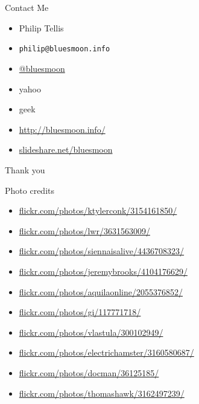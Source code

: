 \documentclass{beamer}
\begin{document}
\section{}

\begin{frame}{Contact Me}
  \begin{itemize}
  \item Philip Tellis
  \item \small{\texttt{philip@bluesmoon.info}}
  \item \href{http://twitter.com/bluesmoon}{@bluesmoon}
  \item yahoo
  \item geek
  \item \href{http://bluesmoon.info/}{http://bluesmoon.info/}
  \item \href{http://www.slideshare.net/bluesmoon}{slideshare.net/bluesmoon}
  \end{itemize}
\end{frame}

\begin{frame}{}
  \begin{center}
  \Large{Thank you}
  \end{center}
\end{frame}

\begin{frame}{Photo credits}
  \begin{itemize}
  \item \href{http://www.flickr.com/photos/ktylerconk/3154161850/}{flickr.com/photos/ktylerconk/3154161850/}
  \item \href{http://www.flickr.com/photos/lwr/3631563009/}{flickr.com/photos/lwr/3631563009/}
  \item \href{http://www.flickr.com/photos/siennaisalive/4436708323/}{flickr.com/photos/siennaisalive/4436708323/}
  \item \href{http://www.flickr.com/photos/jeremybrooks/4104176629/}{flickr.com/photos/jeremybrooks/4104176629/}
  \item \href{http://www.flickr.com/photos/aquilaonline/2055376852/}{flickr.com/photos/aquilaonline/2055376852/}
  \item \href{http://www.flickr.com/photos/gi/117771718/}{flickr.com/photos/gi/117771718/}
  \item \href{http://www.flickr.com/photos/vlastula/300102949/}{flickr.com/photos/vlastula/300102949/}
  \item \href{http://www.flickr.com/photos/electrichamster/3160580687/}{flickr.com/photos/electrichamster/3160580687/}
  \item \href{http://www.flickr.com/photos/docman/36125185/}{flickr.com/photos/docman/36125185/}
  \item \href{http://www.flickr.com/photos/thomashawk/3162497239/}{flickr.com/photos/thomashawk/3162497239/}
  \end{itemize}
\end{frame}
\end{document}
